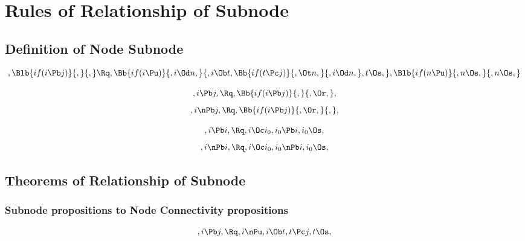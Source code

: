 \chapter{Rules of Relationship of Subnode}

\section{Definition of Node Subnode}
\[,\Blb{if(i \Pb j)}{,}{,} \Rq , \Bb{if(i \Pu)}{, i \Od n, }{, i \Ob t, \Bb{if(t \Pc j)}{, \Ot n,}{, i \Od n,}, t \Os,}, \Blb{if(n \Pu)}{, n \Os, }{, n \Os, }\]


\bigskip
\bigskip
\[, i \Pb j, \Rq , \Bb{if(i \Pb j)}{,}{, \Or,},\]
\bigskip
\bigskip
\[, i \nPb j, \Rq , \Bb{if(i \Pb j)}{, \Or,}{,},\]
\bigskip
\bigskip


\[, i \Pb i, \Rq , i \Oc i_0, i_0 \Pb i, i_0 \Os,\]
\[, i \nPb i, \Rq , i \Oc i_0, i_0 \nPb i, i_0 \Os,\]
\bigskip
\bigskip





\bigskip
\bigskip
\section{Theorems of Relationship of Subnode}
\subsection{Subnode propositions to Node Connectivity propositions}
\[,i \Pb j, \Rq ,   i \nPu, i \Ob t, t \Pc j, t \Os,\]

